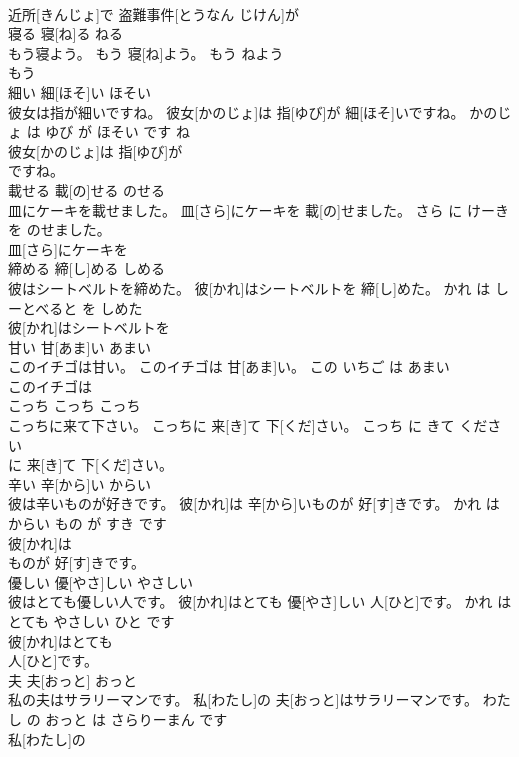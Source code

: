 \documentclass[8pt]{extreport}
\begin{document}
\begin{CJK}{UTF8}{min}
\\	近所[きんじょ]で 盗難事件[とうなん じけん]が
\\	寝る	寝[ね]る	ねる	
\\	もう寝よう。	もう 寝[ね]よう。	もう ねよう	
\\	もう
\\	細い	細[ほそ]い	ほそい	
\\	彼女は指が細いですね。	彼女[かのじょ]は 指[ゆび]が 細[ほそ]いですね。	かのじょ は ゆび が ほそい です ね	
\\	彼女[かのじょ]は 指[ゆび]が
\\	ですね。			
\\	載せる	載[の]せる	のせる	
\\	皿にケーキを載せました。	皿[さら]にケーキを 載[の]せました。	さら に けーき を のせました。	
\\	皿[さら]にケーキを
\\	締める	締[し]める	しめる	
\\	彼はシートベルトを締めた。	彼[かれ]はシートベルトを 締[し]めた。	かれ は しーとべると を しめた	
\\	彼[かれ]はシートベルトを
\\	甘い	甘[あま]い	あまい	
\\	このイチゴは甘い。	このイチゴは 甘[あま]い。	この いちご は あまい	
\\	このイチゴは
\\	こっち	こっち	こっち	
\\	こっちに来て下さい。	こっちに 来[き]て 下[くだ]さい。	こっち に きて ください	
\\	に 来[き]て 下[くだ]さい。			
\\	辛い	辛[から]い	からい	
\\	彼は辛いものが好きです。	彼[かれ]は 辛[から]いものが 好[す]きです。	かれ は からい もの が すき です	
\\	彼[かれ]は
\\	ものが 好[す]きです。			
\\	優しい	優[やさ]しい	やさしい	
\\	彼はとても優しい人です。	彼[かれ]はとても 優[やさ]しい 人[ひと]です。	かれ は とても やさしい ひと です	
\\	彼[かれ]はとても
\\	人[ひと]です。			
\\	夫	夫[おっと]	おっと	
\\	私の夫はサラリーマンです。	私[わたし]の 夫[おっと]はサラリーマンです。	わたし の おっと は さらりーまん です	
\\	私[わたし]の

\end{CJK}
\end{document}
